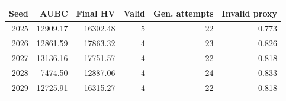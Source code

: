 \begin{tabular}{rrrrrr}
\toprule
Seed & AUBC & Final HV & Valid & Gen. attempts & Invalid proxy \\
\midrule
2025 & 12909.17 & 16302.48 & 5 & 22 & 0.773 \\
2026 & 12861.59 & 17863.32 & 4 & 23 & 0.826 \\
2027 & 13136.16 & 17751.57 & 4 & 22 & 0.818 \\
2028 & 7474.50 & 12887.06 & 4 & 24 & 0.833 \\
2029 & 12725.91 & 16315.27 & 4 & 22 & 0.818 \\
\bottomrule
\end{tabular}
